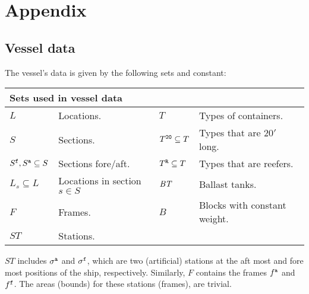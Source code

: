 %
%
\section*{Appendix}
\subsection*{Vessel data}
The vessel's data is given by the following sets and constant:

\vspace{1mm}
\noindent
\begin{tabular}{p{1.8cm}p{4cm}|p{1.3cm}p{4.5cm}}
\multicolumn{2}{l}{\textbf{Sets used in vessel data}}\\
\hline\noalign{\smallskip}
$L$  & Locations. &
$T$	 & Types of containers.\\ 
$S$	 & Sections. &
$T^{\texttt{20}}\subseteq T$ & Types that are $20'$ long. \\
$S^{\texttt{f}}, S^{\texttt{a}}\subseteq S$ & Sections fore/aft. &
$T^{\texttt{R}}\subseteq T$ & Types that are reefers.\\
$L_s\subseteq L$ & Locations in section $s\in S$ &
$\mathit{BT}$ & Ballast tanks. \\
$F$	 & Frames. &
$B$ & Blocks with constant weight.\\
$ST$ & Stations. 
\end{tabular}

\vspace{1mm}
\noindent
$ST$ includes $\sigma^{\texttt{a}}$ and $\sigma^{\texttt{f}}$, which are two (artificial) stations at the aft most and fore most positions of the ship, respectively. Similarly, $F$ contains the frames $f^{\texttt{a}}$ and $f^{\texttt{f}}$. The areas (bounds) for these stations (frames), are trivial.

